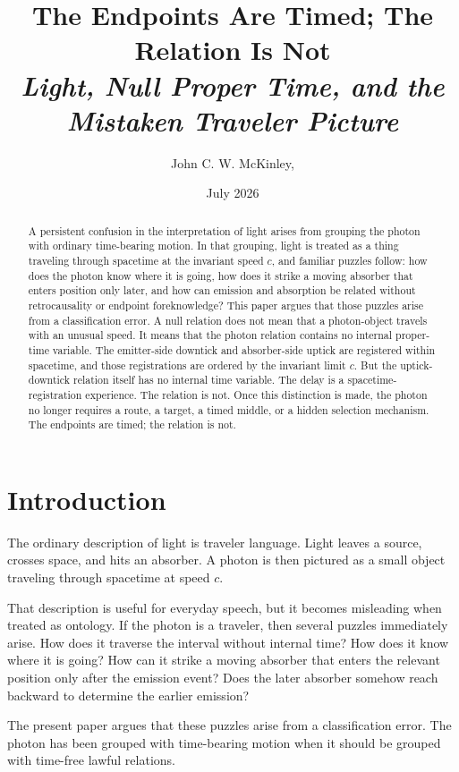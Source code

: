 \documentclass[12pt,onecolumn]{article}
\title{\textbf{The Endpoints Are Timed; The Relation Is Not}\\
\large\textit{Light, Null Proper Time, and the Mistaken Traveler Picture}}
\author{John C. W. McKinley,\orcidlink{0009-0005-7097-5035}}
\date{July 2026}
\begin{document}
\maketitle

\begin{abstract}
A persistent confusion in the interpretation of light arises from grouping the photon with ordinary time-bearing motion. In that grouping, light is treated as a thing traveling through spacetime at the invariant speed $c$, and familiar puzzles follow: how does the photon know where it is going, how does it strike a moving absorber that enters position only later, and how can emission and absorption be related without retrocausality or endpoint foreknowledge? This paper argues that those puzzles arise from a classification error. A null relation does not mean that a photon-object travels with an unusual speed. It means that the photon relation contains no internal proper-time variable. The emitter-side downtick and absorber-side uptick are registered within spacetime, and those registrations are ordered by the invariant limit $c$. But the uptick-downtick relation itself has no internal time variable. The delay is a spacetime-registration experience. The relation is not. Once this distinction is made, the photon no longer requires a route, a target, a timed middle, or a hidden selection mechanism. The endpoints are timed; the relation is not.
\end{abstract}

\section{Introduction}

The ordinary description of light is traveler language. Light leaves a source, crosses space, and hits an absorber. A photon is then pictured as a small object traveling through spacetime at speed $c$.

That description is useful for everyday speech, but it becomes misleading when treated as ontology. If the photon is a traveler, then several puzzles immediately arise. How does it traverse the interval without internal time? How does it know where it is going? How can it strike a moving absorber that enters the relevant position only after the emission event? Does the later absorber somehow reach backward to determine the earlier emission?

The present paper argues that these puzzles arise from a classification error. The photon has been grouped with time-bearing motion when it should be grouped with time-free lawful relations.
\end{document}
